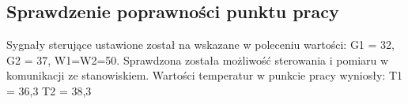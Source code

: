 \subsection{Sprawdzenie poprawności punktu pracy}
\label{lab:zad1}

Sygnały sterujące ustawione został na wskazane w poleceniu wartości:
G1 = 32, G2 = 37, W1=W2=50. Sprawdzona została możliwość sterowania i pomiaru w
komunikacji ze stanowiskiem. Wartości temperatur w punkcie pracy wyniosły:
T1 = 36,3 T2 = 38,3

%       

%       

\newpage
